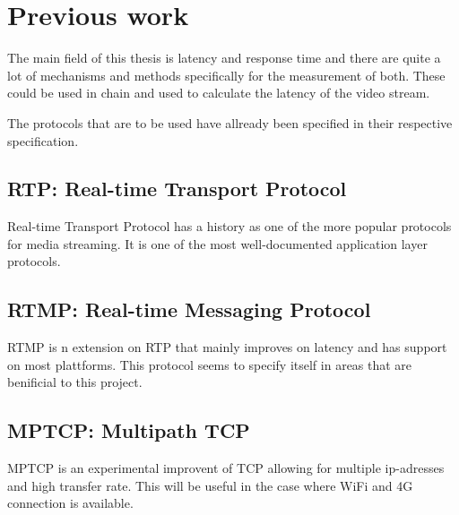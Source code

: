 \documentclass[a4paper]{article}
\begin{document}


\section{Previous work}


The main field of this thesis is latency and response time and there are quite a
lot of mechanisms and methods specifically for the measurement of both. These
could be used in chain and used to calculate the latency of the video stream.

The protocols that are to be used have allready been specified in their
respective specification.

\subsection*{RTP: Real-time Transport Protocol}	
Real-time Transport Protocol has a history as one of the more popular protocols
for media streaming. It is one of the most well-documented application layer
protocols. \cite{spec_RTP}

\subsection{RTMP: Real-time Messaging Protocol}
RTMP is n extension on RTP that mainly improves on latency and has support on
most plattforms. This protocol seems to specify itself in areas that are
benificial to this project. \cite{spec_RTMP}

\subsection{MPTCP: Multipath TCP}
MPTCP is an experimental improvent of TCP allowing for multiple ip-adresses and
high transfer rate. This will be useful in the case where	WiFi and 4G connection
is available. \cite{spec_MPTCP}
\end{document}

